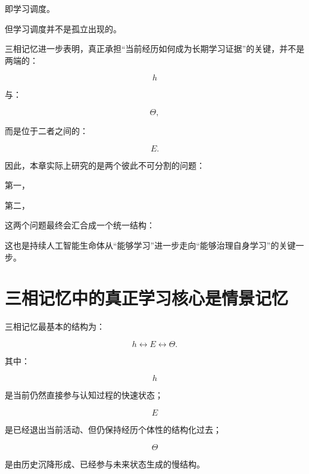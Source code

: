 即学习调度。

但学习调度并不是孤立出现的。

三相记忆进一步表明，真正承担“当前经历如何成为长期学习证据”的关键，并不是两端的：

\[
h
\]

与：

\[
\Theta,
\]

而是位于二者之间的：

\[
\boxed{
E.
}
\]

因此，本章实际上研究的是两个彼此不可分割的问题：

第一，

\begin{statementbox}
\centering
{}
\end{statementbox}

第二，

\begin{statementbox}
\centering
{}
\end{statementbox}

这两个问题最终会汇合成一个统一结构：

\begin{statementbox}
\centering
{}
\end{statementbox}

这也是持续人工智能生命体从“能够学习”进一步走向“能够治理自身学习”的关键一步。


\section{三相记忆中的真正学习核心是情景记忆}

三相记忆最基本的结构为：

\[
h
\leftrightarrow
E
\leftrightarrow
\Theta.
\]

其中：

\[
h
\]

是当前仍然直接参与认知过程的快速状态；

\[
E
\]

是已经退出当前活动、但仍保持经历个体性的结构化过去；

\[
\Theta
\]

是由历史沉降形成、已经参与未来状态生成的慢结构。

